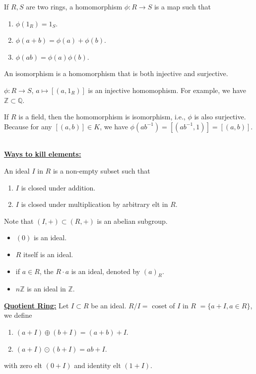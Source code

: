 \documentclass{mynotes}
\begin{document}
\begin{definition}
If $R,S$ are two rings, a homomorphism $\phi:R\rightarrow S$ is a map such that \begin{enumerate}
\item $\phi(1_R)=1_S$.
\item $\phi(a+b) = \phi(a)+\phi(b)$.
\item $\phi(ab) = \phi(a)\phi(b)$.
\end{enumerate}
An isomorphism is a homomorphism that is both injective and surjective.
\end{definition}
$\phi: R\rightarrow S$, $a\mapsto [(a,1_R)]$ is an injective homomophism. For example, we have $\mathbb{Z}\subset \mathbb{Q}$.
\begin{remark}
If $R$ is a field, then the homomorphism is isomorphism, i.e., $\phi$ is also surjective. Because for any $[(a,b)]\in K$, we have $\phi(ab^{-1})=[(ab^{-1},1)] = [(a,b)]$.
\end{remark}\mbox{}\\
\underline{\bfseries Ways to kill elements:}
\begin{definition}
An ideal $I$ in $R$ is a non-empty subset such that 
\begin{enumerate}
\item $I$ is closed under addition.
\item $I$ is closed under multiplication by arbitrary elt in $R$.
\end{enumerate}
Note that $(I, +)\subset (R,+)$ is an abelian subgroup.
\end{definition}
\begin{example}\mbox{}
\begin{itemize}
\item $(0)$ is an ideal.
\item $R$ itself is an ideal.
\item if $a\in R$, the $R\cdot a$ is an ideal, denoted by $(a)_R$.
\item $n\mathbb{Z}$ is an ideal in $\mathbb{Z}$.
\end{itemize}
\end{example}
\underline{\bfseries Quotient Ring:} Let $I\subset R$ be an ideal. $R/I=$ coset of $I$ in $R$ $=\{a+I,a\in R\}$, we define
\begin{enumerate}
\item $(a+I)\oplus(b+I) = (a+b)+I$.
\item $(a+I)\odot(b+I)=ab+I$.
\end{enumerate}
with zero elt $(0+I)$ and identity elt $(1+I)$.
\end{document}

